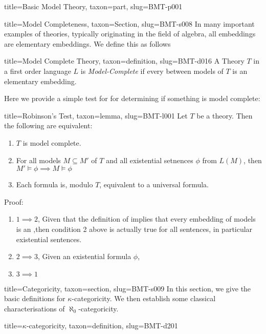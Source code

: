 \documentclass[a4paper]{article}
\begin{document}
\begin{tree}{title={Basic Model Theory}, taxon={part}, slug={BMT-p001}}
\begin{tree}{title={Model Completeness}, taxon={Section}, slug={BMT-s008}}
In many important examples of theories, typically originating in the field of algebra, all embeddings are elementary embeddings. We define this as follows
\begin{tree}{title={Model Complete Theory}, taxon={definition}, slug={BMT-d016}}
A Theory \(T\) in a first order language \(L\) is \emph{Model-Complete} if  every  between models of \(T\) is an elementary embedding. 
\end{tree}
\par{Here we provide a simple test for for determining if something is model complete:}
\begin{tree}{title={Robinson's Test}, taxon={lemma}, slug={BMT-l001}}
 Let \(T\) be a theory. Then the following are equivalent:\begin{enumerate}
\item{\(T\) is model complete.}
    \item{For all models \(M \subseteq  M'\) of \(T\) and all existential setnences \(\phi\) from \(L(M)\), then \(M' \vDash   \phi   \implies  M  \vDash   \phi\)}
    \item{Each formula is, modulo \(T\), equivalent to a universal formula. }
\end{enumerate}\par{Proof: }\begin{enumerate}
\item{\(1 \implies  2\), Given that the definition of  implies that every embedding of models is an ,then condition 2 above is actually true for all sentences, in particular existential sentences. }
    \item{\(2 \implies  3\), Given an existential formula \(\phi\),  }
    \item{\(3 \implies  1\)}
\end{enumerate}
\end{tree}

\end{tree}


  
  
\begin{tree}{title={Categoricity}, taxon={section}, slug={BMT-s009}}
In this section, we give the basic definitions for \(\kappa\)-categoricity. We then establish some classical characterisations of \(\aleph _0\)-categoricity.
\begin{tree}{title={\(\kappa\)-categoricity}, taxon={definition}, slug={BMT-d201}}


\end{tree}
\end{tree}
\end{tree}
\end{document}
